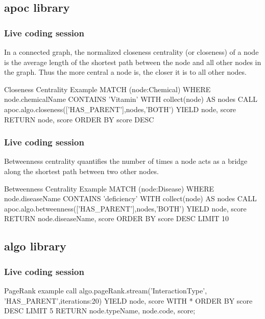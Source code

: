 \documentclass[12pt]{beamer}
\begin{document}
    \subsection{apoc library}
    \begin{frame}
        \frametitle{Live coding session}
        \begin{Definition}
            In a connected graph, the normalized closeness centrality (or closeness) of a node is the average length of the shortest path between the node and all other nodes in the graph. Thus the more central a node is, the closer it is to all other nodes.\footnotemark
        \end{Definition}
        \begin{block}{Closeness Centrality Example}
            MATCH (node:Chemical)
            WHERE node.chemicalName CONTAINS 'Vitamin'
            WITH collect(node) AS nodes
            CALL apoc.algo.closeness(['HAS\_PARENT'],nodes,'BOTH') YIELD node, score
            RETURN node, score
            ORDER BY score DESC
        \end{block}
    \end{frame}
    
    \begin{frame}
        \frametitle{Live coding session}
        \begin{Definition}
            Betweenness centrality quantifies the number of times a node acts as a bridge along the shortest path between two other nodes.\footnotemark
        \end{Definition}
        \begin{block}{Betweenness Centrality Example}
            MATCH (node:Disease)
            WHERE node.diseaseName CONTAINS 'deficiency'
            WITH collect(node) AS nodes
            CALL apoc.algo.betweenness(['HAS\_PARENT'],nodes,'BOTH') YIELD node, score
            RETURN node.diseaseName, score
            ORDER BY score DESC LIMIT 10
        \end{block}
    \end{frame}
    
    \subsection{algo library}
    \begin{frame}
        \frametitle{Live coding session}
        \begin{block}{PageRank example}
            call algo.pageRank.stream('InteractionType', 'HAS\_PARENT',{iterations:20}) YIELD node, score
            WITH * ORDER BY score DESC LIMIT 5
            RETURN node.typeName, node.code, score;
        \end{block}
    \end{frame}
    
\end{document}
